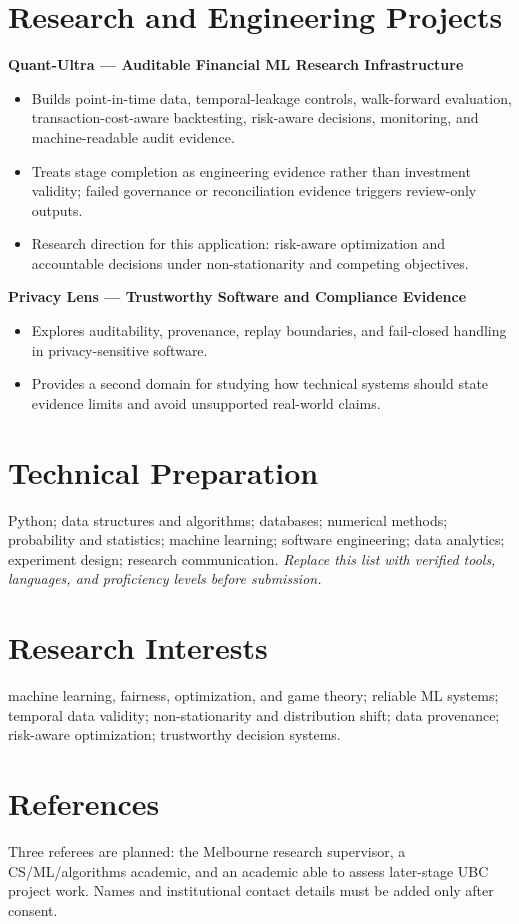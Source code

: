 \documentclass[11pt]{article}
\begin{document}
\section*{Research and Engineering Projects}
\textbf{Quant-Ultra --- Auditable Financial ML Research Infrastructure}
\begin{itemize}
\item Builds point-in-time data, temporal-leakage controls, walk-forward evaluation, transaction-cost-aware backtesting, risk-aware decisions, monitoring, and machine-readable audit evidence.
\item Treats stage completion as engineering evidence rather than investment validity; failed governance or reconciliation evidence triggers review-only outputs.
\item Research direction for this application: risk-aware optimization and accountable decisions under non-stationarity and competing objectives.
\end{itemize}

\begin{samepage}
\textbf{Privacy Lens --- Trustworthy Software and Compliance Evidence}
\begin{itemize}
\item Explores auditability, provenance, replay boundaries, and fail-closed handling in privacy-sensitive software.
\item Provides a second domain for studying how technical systems should state evidence limits and avoid unsupported real-world claims.
\end{itemize}
\end{samepage}

\section*{Technical Preparation}
Python; data structures and algorithms; databases; numerical methods; probability and statistics; machine learning; software engineering; data analytics; experiment design; research communication. \textit{Replace this list with verified tools, languages, and proficiency levels before submission.}

\section*{Research Interests}
machine learning, fairness, optimization, and game theory; reliable ML systems; temporal data validity; non-stationarity and distribution shift; data provenance; risk-aware optimization; trustworthy decision systems.

\section*{References}
Three referees are planned: the Melbourne research supervisor, a CS/ML/algorithms academic, and an academic able to assess later-stage UBC project work. Names and institutional contact details must be added only after consent.
\end{document}
